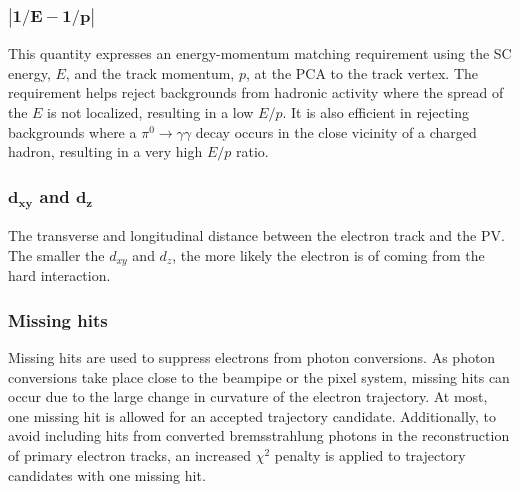 \subsubsection*{$\bm{|1/E - 1/p|}$}
\noindent\justify  
This quantity expresses an energy-momentum matching requirement using the SC energy, $E$, and the track momentum, $p$, at the PCA to the track vertex. 
The requirement helps reject backgrounds from hadronic activity where the spread of the $E$ is not localized, resulting in a low $E/p$. 
It is also efficient in rejecting backgrounds where a $\pi^{0}\rightarrow\gamma\gamma$ decay occurs in the close vicinity of a charged hadron, resulting in a very high $E/p$ ratio.
\subsubsection*{$\bm{d_{xy}}$ and $\bm{d_{z}}$}
\noindent\justify  
The transverse and longitudinal distance between the electron track and the PV. 
The smaller the $d_{xy}$ and $d_{z}$, the more likely the electron is of coming from the hard interaction.
\subsubsection*{Missing hits}
\noindent\justify  
Missing hits are used to suppress electrons from photon conversions. 
As photon conversions take place close to the beampipe or the pixel system, missing hits can occur due to the large change in curvature of the electron trajectory. 
At most, one missing hit is allowed for an accepted trajectory candidate. 
Additionally, to avoid including hits from converted bremsstrahlung photons in the reconstruction of primary electron tracks, an increased $\chi^{2}$ penalty is applied to trajectory candidates with one missing hit.
